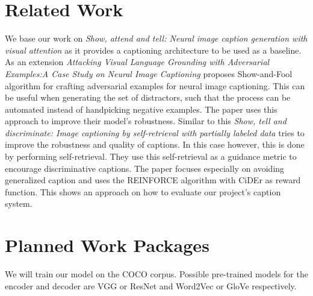 \documentclass[12pt]{article}
\begin{document}
\section{Related Work}

We base our work on \textit{Show, attend and tell: Neural image caption generation with visual attention} \cite{xu2015show} as it provides a captioning architecture to be used as a baseline.
As an extension \textit{Attacking Visual Language Grounding with Adversarial Examples:A Case Study on Neural Image Captioning} \cite{chen2017attacking} proposes Show-and-Fool algorithm for crafting adversarial examples for neural image captioning. This can be useful when generating the set of distractors, such that the process can be automated instead of handpicking negative examples. The paper uses this approach to improve their model’s robustness.
Similar to this \textit{Show, tell and discriminate: Image captioning by self-retrieval with partially labeled data} \cite{liu2018show}  tries to improve the robustness and quality of captions. In this case however, this is done by performing self-retrieval. They use this self-retrieval as a guidance metric to encourage discriminative captions. The paper focuses especially on avoiding generalized caption and uses the REINFORCE algorithm with CiDEr as reward function. This shows an approach on how to evaluate our project’s caption system.

\section{Planned Work Packages}

We will train our model on the COCO corpus.
Possible pre-trained models for the encoder and decoder are VGG or ResNet and Word2Vec or GloVe respectively.



\newpage

 

\end{document}
